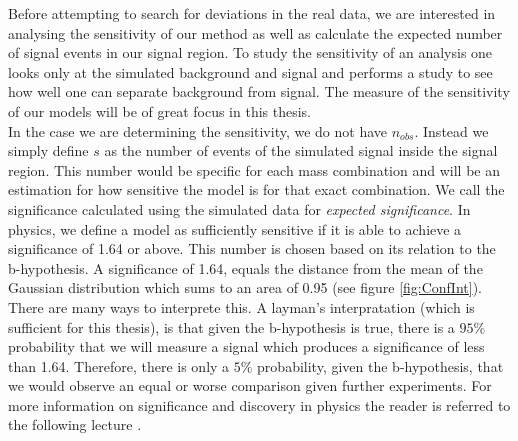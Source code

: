 Before attempting to search for deviations in the real data, we are interested in analysing the sensitivity of our method as well 
as calculate the expected number of signal events in our signal region. To study the sensitivity of an analysis one looks only at the 
simulated background and signal and performs a study to see how well one can separate background from signal. The measure of the sensitivity 
of our models will be of great focus in this thesis.
\\
In the case we are determining the sensitivity, we do not have $n_{obs}$. Instead we simply define $s$ as the number of events of the simulated signal 
inside the signal region. This number would be specific for each mass combination and will be an estimation for how sensitive 
the model is for that exact combination. We call the significance calculated using the simulated data for \emph{expected significance}. 
In physics, we define a model as sufficiently sensitive if it is able to achieve a significance of 1.64 or above. This number is chosen based on 
its relation to the b-hypothesis. A significance of 1.64, equals the distance from the mean of the Gaussian distribution which sums to an area of 
0.95 (see figure \ref{fig:ConfInt}). There are many ways to interprete this. A layman's interpratation (which is sufficient for this thesis), is 
that given the b-hypothesis is true, there is a $95\%$ probability that we will measure a signal which produces a significance of less than 
1.64. Therefore, there is only a $5\%$ probability, given the b-hypothesis, that we would observe an equal or worse comparison given further experiments. 
For more information on significance and discovery in physics the reader is referred to the following lecture \cite{magnar}.